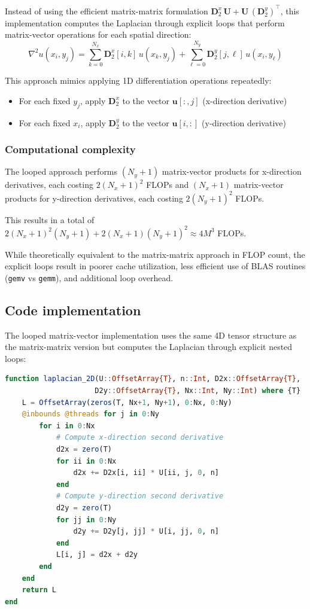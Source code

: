 Instead of using the efficient matrix-matrix formulation $\mathbf{D}_2^x\,\mathbf{U} + \mathbf{U}\,(\mathbf{D}_2^y)^\top$, this implementation computes the Laplacian through explicit loops that perform matrix-vector operations for each spatial direction:
\begin{equation}
\nabla^2 u(x_i, y_j) = \sum_{k=0}^{N_x} \mathbf{D}_2^x[i,k] \, u(x_k, y_j) + \sum_{\ell=0}^{N_y} \mathbf{D}_2^y[j,\ell] \, u(x_i, y_\ell)
\end{equation}

This approach mimics applying 1D differentiation operations repeatedly:
\begin{itemize}
    \item For each fixed $y_j$, apply $\mathbf{D}_2^x$ to the vector $\mathbf{u}[:, j]$ (x-direction derivative)
    \item For each fixed $x_i$, apply $\mathbf{D}_2^y$ to the vector $\mathbf{u}[i, :]$ (y-direction derivative)
\end{itemize}

\subsubsection*{Computational complexity}

The looped approach performs $(N_y + 1)$ matrix-vector products for x-direction derivatives, each costing $2(N_x + 1)^2$ FLOPs and $(N_x + 1)$ matrix-vector products for y-direction derivatives, each costing $2(N_y + 1)^2$ FLOPs.

This results in a total of $2(N_x + 1)^2(N_y + 1) + 2(N_x + 1)(N_y + 1)^2 \approx 4M^3$ FLOPs.

While theoretically equivalent to the matrix-matrix approach in FLOP count, the explicit loops result in poorer cache utilization, less efficient use of BLAS routines (\texttt{gemv} vs \texttt{gemm}), and additional loop overhead.

\clearpage

\subsection{Code implementation}

The looped matrix-vector implementation uses the same 4D tensor structure as the matrix-matrix version but computes the Laplacian through explicit nested loops:

\begin{lstlisting}[language=Julia]
function laplacian_2D(U::OffsetArray{T}, n::Int, D2x::OffsetArray{T}, 
                     D2y::OffsetArray{T}, Nx::Int, Ny::Int) where {T}
    L = OffsetArray(zeros(T, Nx+1, Ny+1), 0:Nx, 0:Ny)
    @inbounds @threads for j in 0:Ny
        for i in 0:Nx
            # Compute x-direction second derivative
            d2x = zero(T)
            for ii in 0:Nx
                d2x += D2x[i, ii] * U[ii, j, 0, n]
            end
            # Compute y-direction second derivative
            d2y = zero(T)
            for jj in 0:Ny
                d2y += D2y[j, jj] * U[i, jj, 0, n]
            end
            L[i, j] = d2x + d2y
        end
    end
    return L
end
\end{lstlisting}

